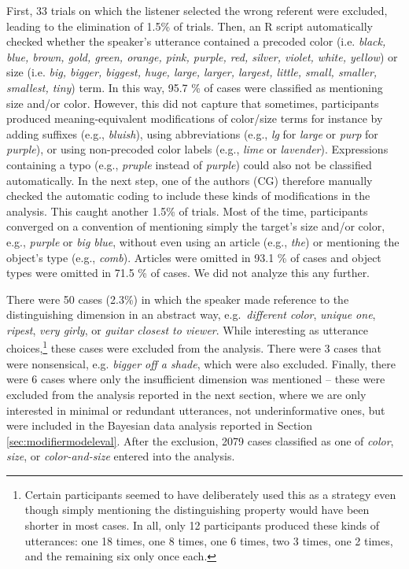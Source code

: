 \documentclass[11pt]{article}
\newcommand{\sectionref}[1]{Section \ref{#1}}
\begin{document}
First, 33 trials on which the listener selected the wrong referent were excluded, leading to the elimination of 1.5\% of trials. Then, an R script automatically checked whether the speaker's utterance contained a precoded color (i.e. \emph{black, blue, brown, gold, green, orange, pink, purple, red, silver, violet, white, yellow}) or size (i.e. \emph{big, bigger, biggest, huge, large, larger, largest, little, small, smaller, smallest, tiny}) term. In this way, 95.7 \% of cases were classified as mentioning size and/or color. However, this did not capture that sometimes, participants produced meaning-equivalent modifications of color/size terms for instance by adding suffixes (e.g., \emph{bluish}), using abbreviations (e.g., \emph{lg} for \emph{large} or \emph{purp} for \emph{purple}), or using non-precoded color labels (e.g., \emph{lime} or \emph{lavender}). Expressions containing a typo (e.g., \emph{pruple} instead of \emph{purple}) could also not be classified automatically. In the next step, one of the authors (CG) therefore manually checked the automatic coding to include these kinds of modifications in the analysis. This caught another 1.5\% of trials. Most of the time, participants converged on a convention of mentioning simply the target's size and/or color, e.g., \emph{purple} or \emph{big blue}, without even using an article (e.g., \emph{the}) or mentioning the object's type (e.g., \emph{comb}). Articles were omitted in 93.1 \% of cases and object types were omitted in 71.5 \% of cases. We did not analyze this any further.

There were 50 cases (2.3\%) in which the speaker made reference to the distinguishing dimension in an abstract way, e.g.~\emph{different color}, \emph{unique one}, \emph{ripest}, \emph{very girly}, or \emph{guitar closest to viewer}. While interesting as utterance choices,\footnote{Certain participants seemed to have deliberately used this as a strategy even though simply mentioning the distinguishing property would have been shorter in most cases. In all, only 12 participants produced these kinds of utterances: one 18 times, one 8 times, one 6 times, two 3 times, one 2 times, and the remaining six only once each.} these cases were excluded from the analysis. There were 3 cases that were nonsensical, e.g. \emph{bigger off a shade}, which were also excluded. Finally, there were 6 cases where only the insufficient dimension was mentioned -- these were excluded from the analysis reported in the next section, where we are only interested in minimal or redundant utterances, not underinformative ones, but were included in the Bayesian data analysis reported in \sectionref{sec:modifiermodeleval}. After the exclusion, 2079 cases classified as one of \emph{color}, \emph{size}, or \emph{color-and-size} entered into the analysis.
\end{document}
